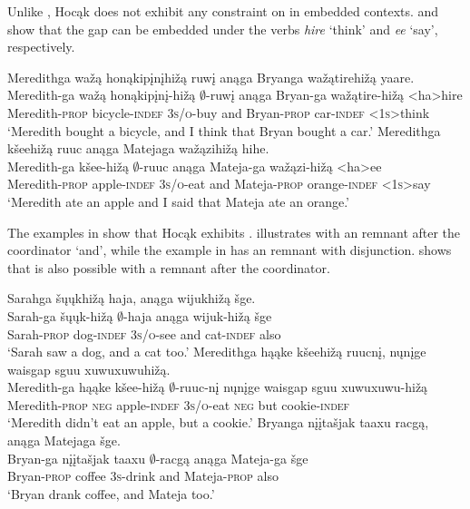 \documentclass[output=paper]{LSP/langsci}
\begin{document}
Unlike , Hocąk does not exhibit any constraint on  in embedded contexts.  and  show that the gap can be embedded under the verbs \emph{hire} `think' and \emph{ee} `say', respectively.

 
\ea
\ea\label{ex:johnson:39a} 
\glll Meredithga {wažą honąkipįnįhižą} ruwį anąga Bryanga wažątirehižą yaare.\\
Meredith-ga {wažą honąkipįnį-hižą} $\emptyset$-ruwį anąga Bryan-ga wažątire-hižą <ha>hire\\
Meredith-\textsc{prop} bicycle-\textsc{indef} \textsc{3s/o}-buy and Bryan-\textsc{prop} car-\textsc{indef} \textsc{<1s>}think\\
\trans `Meredith bought a bicycle, and I think that Bryan bought a car.'
\ex\label{ex:johnson:39b}
\glll Meredithga kšeehižą ruuc anąga Matejaga wažązihižą hihe.\\
Meredith-ga kšee-hižą $\emptyset$-ruuc anąga Mateja-ga wažązi-hižą <ha>ee\\
Meredith-\textsc{prop} apple-\textsc{indef} \textsc{3s/o}-eat and Mateja-\textsc{prop} orange-\textsc{indef} <\textsc{1s}>say\\
\trans `Meredith ate an apple and I said that Mateja ate an orange.'
\z
\z

 
The examples in  show that Hocąk exhibits .  illustrates  with an  remnant after the coordinator `and', while the example in  has an  remnant with disjunction.  shows that  is also possible with a  remnant after the coordinator.
 

\ea\label{ex:johnson:40} 
\ea\label{ex:johnson:40a} 
\glll Sarahga šųųkhižą haja, anąga wijukhižą šge.\\
Sarah-ga šųųk-hižą $\emptyset$-haja anąga wijuk-hižą šge\\
Sarah-\textsc{prop} dog-\textsc{indef} \textsc{3s/o}-see and cat-\textsc{indef} also\\
\trans `Sarah saw a dog, and a cat too.'
 \ex\label{ex:johnson:40b}
\glll Meredithga hąąke kšeehižą ruucnį, nųnįge {waisgap sguu xuwuxuwuhižą}.\\
Meredith-ga hąąke kšee-hižą $\emptyset$-ruuc-nį nųnįge {waisgap sguu xuwuxuwu-hižą}\\
Meredith-\textsc{prop} \textsc{neg} apple-\textsc{indef} \textsc{3s/o}-eat \textsc{neg} but cookie-\textsc{indef}\\
\trans `Meredith didn't eat an apple, but a cookie.'
 \ex\label{ex:johnson:40c}
\glll Bryanga {nįįtašjak taaxu} racgą, anąga Matejaga šge.\\
Bryan-ga {nįįtašjak taaxu} $\emptyset$-racgą anąga Mateja-ga šge\\
Bryan-\textsc{prop} coffee \textsc{3s}-drink and Mateja-\textsc{prop} also\\
\trans `Bryan drank coffee, and Mateja too.'
\z
\z
\end{document}
